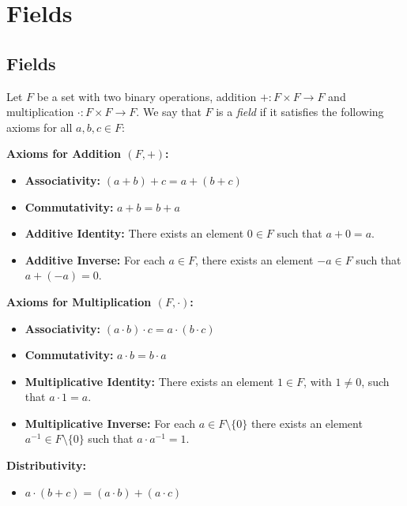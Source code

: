 \documentclass[../linear_algebra_and_groups.tex]{subfiles}
\begin{document}
\chapter{Fields}

\section{Fields}

\begin{definition}[Field]
    \begin{shaded*}
        Let $F$ be a set with two binary operations, addition $+:F\times F\to F$ and multiplication $\cdot :F\times F\to F$. We say that $F$ is a \textit{field} if it satisfies the following axioms for all $a, b, c \in F$:\par
        \noindent \textbf{Axioms for Addition $(F, +)$:}
        \begin{itemize}
            \item[\textbf{A1.}] \textbf{Associativity:} $(a + b) + c = a + (b + c)$
            \item[\textbf{A2.}] \textbf{Commutativity:} $a + b = b + a$
            \item[\textbf{A3.}] \textbf{Additive Identity:} There exists an element $0 \in F$ such that $a + 0 = a$.
            \item[\textbf{A4.}] \textbf{Additive Inverse:} For each $a \in F$, there exists an element $-a \in F$ such that $a + (-a) = 0$.
        \end{itemize}

        \noindent \textbf{Axioms for Multiplication $(F, \cdot)$:}
        \begin{itemize}
            \item[\textbf{M1.}] \textbf{Associativity:} $(a \cdot b) \cdot c = a \cdot (b \cdot c)$
            \item[\textbf{M2.}] \textbf{Commutativity:} $a \cdot b = b \cdot a$
            \item[\textbf{M3.}] \textbf{Multiplicative Identity:} There exists an element $1 \in F$, with $1 \neq 0$, such that $a \cdot 1 = a$.
            \item[\textbf{M4.}] \textbf{Multiplicative Inverse:} For each $a \in F\setminus\{0\}$ there exists an element $a^{-1} \in F\setminus\{0\}$ such that $a \cdot a^{-1} = 1$.
        \end{itemize}

        \noindent \textbf{Distributivity:}
        \begin{itemize}
            \item[\textbf{D1.}] $a \cdot (b + c) = (a \cdot b) + (a \cdot c)$
        \end{itemize}
    \end{shaded*}
\end{definition}
\end{document}
